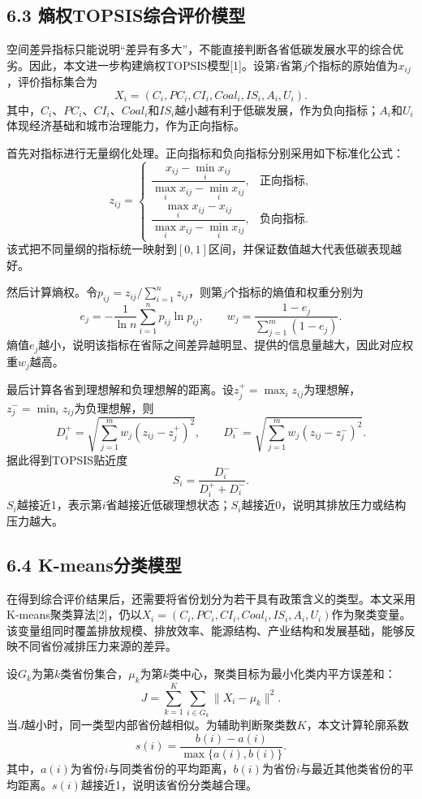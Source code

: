 \documentclass[UTF8,zihao=-4,fontset=fandol]{ctexart}
\begin{document}
\subsection*{6.3 熵权TOPSIS综合评价模型}

空间差异指标只能说明“差异有多大”，不能直接判断各省低碳发展水平的综合优劣。因此，本文进一步构建熵权TOPSIS模型[1]。设第$i$省第$j$个指标的原始值为$x_{ij}$，评价指标集合为
\[
X_i=(C_i,PC_i,CI_i,Coal_i,IS_i,A_i,U_i).
\]
其中，$C_i$、$PC_i$、$CI_i$、$Coal_i$和$IS_i$越小越有利于低碳发展，作为负向指标；$A_i$和$U_i$体现经济基础和城市治理能力，作为正向指标。

首先对指标进行无量纲化处理。正向指标和负向指标分别采用如下标准化公式：
\[
z_{ij}=
\begin{cases}
\dfrac{x_{ij}-\min_i x_{ij}}{\max_i x_{ij}-\min_i x_{ij}}, & \text{正向指标},\\[8pt]
\dfrac{\max_i x_{ij}-x_{ij}}{\max_i x_{ij}-\min_i x_{ij}}, & \text{负向指标}.
\end{cases}
\]
该式把不同量纲的指标统一映射到$[0,1]$区间，并保证数值越大代表低碳表现越好。

然后计算熵权。令$p_{ij}=z_{ij}/\sum_{i=1}^{n}z_{ij}$，则第$j$个指标的熵值和权重分别为
\[
e_j=-\frac{1}{\ln n}\sum_{i=1}^{n}p_{ij}\ln p_{ij},\qquad
w_j=\frac{1-e_j}{\sum_{j=1}^{m}(1-e_j)}.
\]
熵值$e_j$越小，说明该指标在省际之间差异越明显、提供的信息量越大，因此对应权重$w_j$越高。

最后计算各省到理想解和负理想解的距离。设$z_j^+=\max_i z_{ij}$为理想解，$z_j^-=\min_i z_{ij}$为负理想解，则
\[
D_i^+=\sqrt{\sum_{j=1}^{m}w_j(z_{ij}-z_j^+)^2},\qquad
D_i^-=\sqrt{\sum_{j=1}^{m}w_j(z_{ij}-z_j^-)^2}.
\]
据此得到TOPSIS贴近度
\[
S_i=\frac{D_i^-}{D_i^++D_i^-}.
\]
$S_i$越接近1，表示第$i$省越接近低碳理想状态；$S_i$越接近0，说明其排放压力或结构压力越大。

\subsection*{6.4 K-means分类模型}

在得到综合评价结果后，还需要将省份划分为若干具有政策含义的类型。本文采用K-means聚类算法[2]，仍以$X_i=(C_i,PC_i,CI_i,Coal_i,IS_i,A_i,U_i)$作为聚类变量。该变量组同时覆盖排放规模、排放效率、能源结构、产业结构和发展基础，能够反映不同省份减排压力来源的差异。

设$G_k$为第$k$类省份集合，$\mu_k$为第$k$类中心，聚类目标为最小化类内平方误差和：
\[
J=\sum_{k=1}^{K}\sum_{i\in G_k}\|X_i-\mu_k\|^2.
\]
当$J$越小时，同一类型内部省份越相似。为辅助判断聚类数$K$，本文计算轮廓系数
\[
s(i)=\frac{b(i)-a(i)}{\max\{a(i),b(i)\}}.
\]
其中，$a(i)$为省份$i$与同类省份的平均距离，$b(i)$为省份$i$与最近其他类省份的平均距离。$s(i)$越接近1，说明该省份分类越合理。
\end{document}
